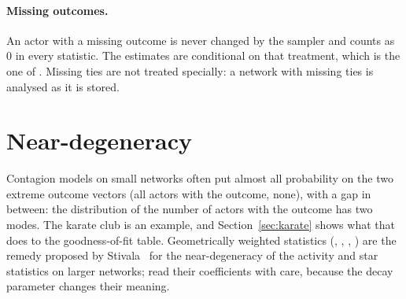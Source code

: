 \paragraph{Missing outcomes.} An actor with a missing outcome is never changed by the sampler and counts as 0 in every statistic. The estimates are conditional on that treatment, which is the one of \alaamee{}. Missing ties are not treated specially: a network with missing ties is analysed as it is stored.

\section{Near-degeneracy}

Contagion models on small networks often put almost all probability on the two extreme outcome vectors (all actors with the outcome, none), with a gap in between: the distribution of the number of actors with the outcome has two modes. The karate club is an example, and Section~\ref{sec:karate} shows what that does to the goodness-of-fit table. Geometrically weighted statistics (, , , ) are the remedy proposed by Stivala~\cite{stivala2023} for the near-degeneracy of the activity and star statistics on larger networks; read their coefficients with care, because the decay parameter changes their meaning.
